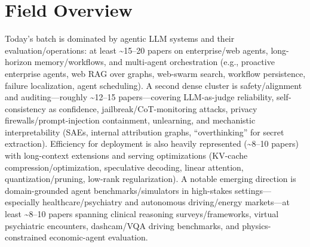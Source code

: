 \documentclass[12pt,letterpaper]{article}
\begin{document}
\section*{Field Overview}
{\footnotesize Today's batch is dominated by agentic LLM systems and their evaluation/operations: at least \textasciitilde{}15--20 papers on enterprise/web agents, long-horizon memory/workflows, and multi-agent orchestration (e.g., proactive enterprise agents, web RAG over graphs, web-swarm search, workflow persistence, failure localization, agent scheduling). A second dense cluster is safety/alignment and auditing---roughly \textasciitilde{}12--15 papers---covering LLM-as-judge reliability, self-consistency as confidence, jailbreak/CoT-monitoring attacks, privacy firewalls/prompt-injection containment, unlearning, and mechanistic interpretability (SAEs, internal attribution graphs, ``overthinking'' for secret extraction). Efficiency for deployment is also heavily represented (\textasciitilde{}8--10 papers) with long-context extensions and serving optimizations (KV-cache compression/optimization, speculative decoding, linear attention, quantization/pruning, low-rank regularization). A notable emerging direction is domain-grounded agent benchmarks/simulators in high-stakes settings---especially healthcare/psychiatry and autonomous driving/energy markets---at least \textasciitilde{}8--10 papers spanning clinical reasoning surveys/frameworks, virtual psychiatric encounters, dashcam/VQA driving benchmarks, and physics-constrained economic-agent evaluation.}
\end{document}
